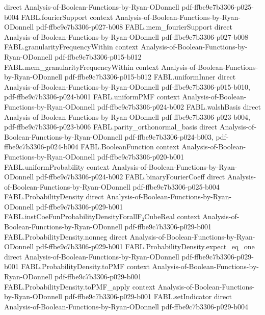 \begin{theorem}
  {direct}
  {Analysis-of-Boolean-Functions-by-Ryan-ODonnell}
  {pdf-ffbe9c7b3306-p025-b004}
\proofstep
  {FABL.fourierSupport}
  {context}
  {Analysis-of-Boolean-Functions-by-Ryan-ODonnell}
  {pdf-ffbe9c7b3306-p027-b008}
\proofstep
  {FABL.mem_fourierSupport}
  {direct}
  {Analysis-of-Boolean-Functions-by-Ryan-ODonnell}
  {pdf-ffbe9c7b3306-p027-b008}
\proofstep
  {FABL.granularityFrequencyWithin}
  {context}
  {Analysis-of-Boolean-Functions-by-Ryan-ODonnell}
  {pdf-ffbe9c7b3306-p015-b012}
\proofstep
  {FABL.mem_granularityFrequencyWithin}
  {context}
  {Analysis-of-Boolean-Functions-by-Ryan-ODonnell}
  {pdf-ffbe9c7b3306-p015-b012}
\proofstep
  {FABL.uniformInner}
  {direct}
  {Analysis-of-Boolean-Functions-by-Ryan-ODonnell}
  {pdf-ffbe9c7b3306-p015-b010,
    pdf-ffbe9c7b3306-p024-b001}
\proofstep
  {FABL.uniformPMF}
  {context}
  {Analysis-of-Boolean-Functions-by-Ryan-ODonnell}
  {pdf-ffbe9c7b3306-p024-b002}
\proofstep
  {FABL.walshBasis}
  {direct}
  {Analysis-of-Boolean-Functions-by-Ryan-ODonnell}
  {pdf-ffbe9c7b3306-p023-b004,
    pdf-ffbe9c7b3306-p023-b006}
\proofstep
  {FABL.parity_orthonormal_basis}
  {direct}
  {Analysis-of-Boolean-Functions-by-Ryan-ODonnell}
  {pdf-ffbe9c7b3306-p024-b003,
    pdf-ffbe9c7b3306-p024-b004}
\proofstep
  {FABL.BooleanFunction}
  {context}
  {Analysis-of-Boolean-Functions-by-Ryan-ODonnell}
  {pdf-ffbe9c7b3306-p020-b001}
\proofstep
  {FABL.uniformProbability}
  {context}
  {Analysis-of-Boolean-Functions-by-Ryan-ODonnell}
  {pdf-ffbe9c7b3306-p024-b002}
\proofstep
  {FABL.binaryFourierCoeff}
  {direct}
  {Analysis-of-Boolean-Functions-by-Ryan-ODonnell}
  {pdf-ffbe9c7b3306-p025-b004}
\proofstep
  {FABL.ProbabilityDensity}
  {direct}
  {Analysis-of-Boolean-Functions-by-Ryan-ODonnell}
  {pdf-ffbe9c7b3306-p029-b001}
\proofstep
  {FABL.instCoeFunProbabilityDensityForallF₂CubeReal}
  {context}
  {Analysis-of-Boolean-Functions-by-Ryan-ODonnell}
  {pdf-ffbe9c7b3306-p029-b001}
\proofstep
  {FABL.ProbabilityDensity.nonneg}
  {direct}
  {Analysis-of-Boolean-Functions-by-Ryan-ODonnell}
  {pdf-ffbe9c7b3306-p029-b001}
\proofstep
  {FABL.ProbabilityDensity.expect_eq_one}
  {direct}
  {Analysis-of-Boolean-Functions-by-Ryan-ODonnell}
  {pdf-ffbe9c7b3306-p029-b001}
\proofstep
  {FABL.ProbabilityDensity.toPMF}
  {context}
  {Analysis-of-Boolean-Functions-by-Ryan-ODonnell}
  {pdf-ffbe9c7b3306-p029-b001}
\proofstep
  {FABL.ProbabilityDensity.toPMF_apply}
  {context}
  {Analysis-of-Boolean-Functions-by-Ryan-ODonnell}
  {pdf-ffbe9c7b3306-p029-b001}
\proofstep
  {FABL.setIndicator}
  {direct}
  {Analysis-of-Boolean-Functions-by-Ryan-ODonnell}
  {pdf-ffbe9c7b3306-p029-b004}

\end{theorem}
